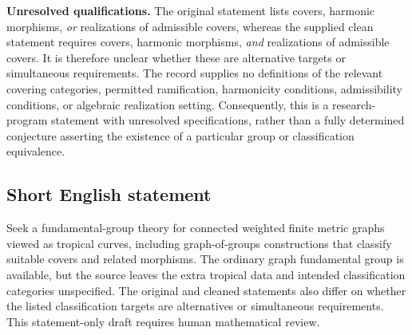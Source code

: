 \documentclass[11pt]{article}
\begin{document}
\textbf{Unresolved qualifications.} The original statement lists covers, harmonic morphisms, \emph{or} realizations of admissible covers, whereas the supplied clean statement requires covers, harmonic morphisms, \emph{and} realizations of admissible covers. It is therefore unclear whether these are alternative targets or simultaneous requirements. The record supplies no definitions of the relevant covering categories, permitted ramification, harmonicity conditions, admissibility conditions, or algebraic realization setting. Consequently, this is a research-program statement with unresolved specifications, rather than a fully determined conjecture asserting the existence of a particular group or classification equivalence.
\subsection{Short English statement}
Seek a fundamental-group theory for connected weighted finite metric graphs viewed as tropical curves, including graph-of-groups constructions that classify suitable covers and related morphisms. The ordinary graph fundamental group is available, but the source leaves the extra tropical data and intended classification categories unspecified. The original and cleaned statements also differ on whether the listed classification targets are alternatives or simultaneous requirements. This statement-only draft requires human mathematical review.
\end{document}
